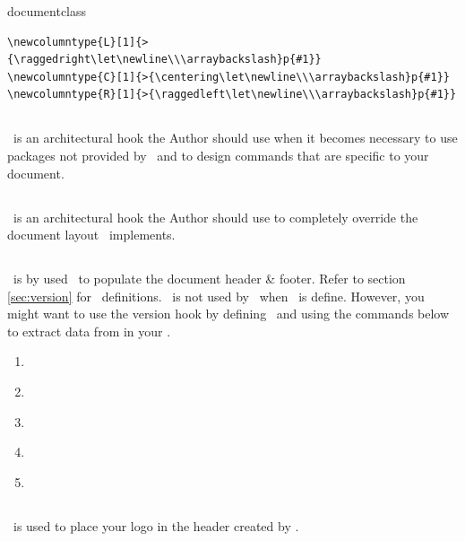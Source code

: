 documentclass\documentclass[12pt]{tlc-article}
\begin{document}
\begin{lstlisting}[basicstyle=\tiny]
\newcolumntype{L}[1]{>{\raggedright\let\newline\\\arraybackslash}p{#1}}
\newcolumntype{C}[1]{>{\centering\let\newline\\\arraybackslash}p{#1}}
\newcolumntype{R}[1]{>{\raggedleft\let\newline\\\arraybackslash}p{#1}}
\end{lstlisting}

\subsection{\tlcAL}
\tlcAL\ is an architectural hook the Author should use when it becomes necessary
to use packages not provided by \tlcA\, and to design commands that are specific
to your document.

\subsection{\tlcHF}
\tlcHF\ is an architectural hook the Author should use to completely override
the document layout \tlcA\ implements.

\subsection{\tlcVE}
\tlcVE\ is by used \tlcA\ to populate the document header \& footer.  Refer to
section \ref{sec:version} for \tlcVE\ definitions. \tlcVE\ is not
used by \tlcA\ when \tlcHF\ is define.  However, you might want to use the
version hook by defining \tlcVE\ and using the commands below to extract data
from \tlcVE in your \tlcHF.
\begin{enumerate}
  \item \tlcVC\
  \item \tlcDC\
  \item \tlcSC\
  \item \tlcIC\
  \item \tlcPC\
\end{enumerate}

\subsection{\tlcLG}
\tlcLG\ is used to place your logo in the header created by \tlcA. 
\end{document}
